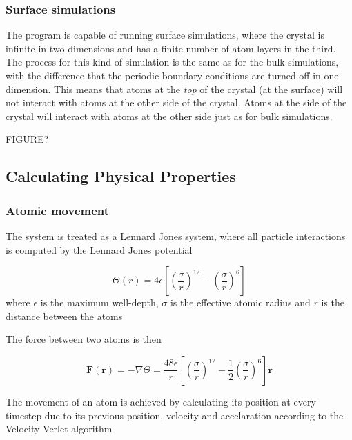 \documentclass[12pt,a4paper]{article}
\begin{document}
\subsubsection{Surface simulations}
\label{sec:surface_simulations}
The program is capable of running surface simulations, where the crystal is infinite in two dimensions and has a finite number of atom layers in the third. The process for this kind of simulation is the same as for the bulk simulations, with the difference that the periodic boundary conditions are turned off in one dimension. This means that atoms at the \emph{top} of the crystal (at the surface) will not interact with atoms at the other side of the crystal. Atoms at the side of the crystal will interact with atoms at the other side just as for bulk simulations. 

FIGURE?


\subsection{Calculating Physical Properties}
\label{sec:calculating_physical_properties}

\subsubsection{Atomic movement}
The system is treated as a Lennard Jones system, where all particle interactions is computed by the Lennard Jones potential 

\begin{equation}
\label{eq:LJ}
\Theta(r)=4 \epsilon \left[\left(\frac{\sigma}{r}\right)^{12} - \left(\frac{\sigma}{r}\right)^6\right]
\end{equation}
where \( \epsilon\) is the maximum well-depth, \( \sigma \) is the effective atomic radius and \( r\) is the distance between the atoms

The force between two atoms is then

\begin{equation}
\mathbf F(\mathbf r) = - \nabla \Theta = \frac{48\epsilon}{r} \left[\left(\frac{\sigma}{r}\right)^{12} - \frac 1 2 \left(\frac{\sigma}{r}\right)^6\right] \mathbf r
\end{equation}

The movement of an atom is achieved by calculating its position at every timestep due to its previous position, velocity and accelaration according to the Velocity Verlet algorithm
\end{document}
